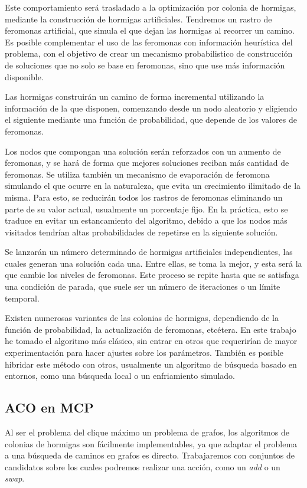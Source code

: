 Este comportamiento será trasladado a la optimización por colonia de hormigas,
mediante la construcción de hormigas artificiales. Tendremos un rastro de feromonas
artificial, que simula el que dejan las hormigas al recorrer un camino. Es posible
complementar el uso de las feromonas con información heurística del problema,
con el objetivo de crear un mecanismo probabilistico de construcción de soluciones
que no solo se base en feromonas, sino que use más información disponible.

Las hormigas construirán un camino de forma incremental utilizando la información
de la que disponen, comenzando desde un nodo aleatorio y eligiendo el siguiente
mediante una función de probabilidad, que depende de los valores de feromonas.

Los nodos que compongan una solución serán reforzados con un aumento de feromonas, y
se hará de forma que mejores soluciones reciban más cantidad de feromonas.
Se utiliza también un mecanismo de evaporación de feromona simulando el que ocurre en
la naturaleza, que evita un crecimiento ilimitado de la misma. Para esto, se reducirán
todos los rastros de feromonas eliminando un parte de su valor actual, usualmente un
porcentaje fijo. En la práctica, esto se traduce en evitar un estancamiento del algoritmo,
debido a que los nodos más visitados tendrían altas probabilidades de repetirse en la
siguiente solución.

Se lanzarán un número determinado de hormigas artificiales independientes, las
cuales generan una solución cada una. Entre ellas, se toma la mejor, y esta será la
que cambie los niveles de feromonas. Este proceso se repite hasta que se satisfaga una
condición de parada, que suele ser un número de iteraciones o un límite temporal.

Existen numerosas variantes de las colonias de hormigas, dependiendo de la función de
probabilidad, la actualización de feromonas, etcétera. En este trabajo he tomado el
algoritmo más clásico, sin entrar en otros que requerirían de mayor experimentación
para hacer ajustes sobre los parámetros. También es posible hibridar este método
con otros, usualmente un algoritmo de búsqueda basado en entornos, como una búsqueda
local o un enfriamiento simulado.

\subsection{ACO en MCP}

Al ser el problema del clique máximo un problema de grafos, los algoritmos de colonias
de hormigas son fácilmente implementables, ya que adaptar el problema a una búsqueda
de caminos en grafos es directo. Trabajaremos con conjuntos de candidatos sobre los
cuales podremos realizar una acción, como un \textit{add} o un \textit{swap}.

